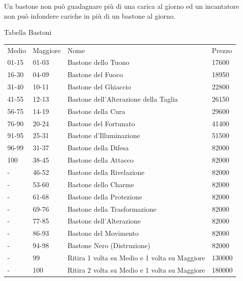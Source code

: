 \documentclass[a4paper,11pt,twoside,openany]{book}
\begin{document}
Un bastone non può guadagnare più di una carica al giorno ed un incantatore non può infondere cariche in più di un bastone al giorno.

\bigskip

Tabella Bastoni

\begin{tabularx}{0.95\textwidth}{llXl}
	\toprule
	Medio & Maggiore & Nome& Prezzo\\
	01-15 & 01-03    & Bastone dello Tuono \index{Bastone dello Tuono}     & 17600\\
	16-30 & 04-09    & Bastone del Fuoco \index{Bastone del Fuoco}         & 18950\\
	31-40 & 10-11    & Bastone del Ghiaccio \index{Bastone del Ghiaccio}   & 22800\\
	41-55 & 12-13    & Bastone dell'Alterazione della Taglia \index{Bastone dell'Alterazione della Taglia} & 26150\\
	56-75 & 14-19    & Bastone della Cura \index{Bastone della Cura}       & 29600\\
	76-90 & 20-24    & Bastone del Fortunato \index{Bastone del Fortunato} & 41400\\
	91-95 & 25-31    & Bastone d'Illuminazione \index{Bastone d'Illuminazione}             & 51500\\
	96-99 & 31-37    & Bastone della Difesa \index{Bastone della Difesa}   & 82000\\
	100   & 38-45    & Bastone della Attacco \index{Bastone della Attacco} & 82000\\
	-     & 46-52    & Bastone della Rivelazione \index{Bastone della Rivelazione}         & 82000\\
	-     & 53-60    & Bastone dello Charme \index{Bastone dello Charme}   & 82000\\
	-     & 61-68    & Bastone della Protezione \index{Bastone della Protezione}           & 82000\\
	-     & 69-76    & Bastone della Trasformazione \index{Bastone della Trasformazione}   & 82000\\
	-     & 77-85    & Bastone dell'Alterazione \index{Bastone dell'Alterazione}           & 82000\\
	-     & 86-93    & Bastone del Movimento \index{Bastone del Movimento} & 82000\\
	-     & 94-98    & Bastone Nero (Distruzione) \index{Bastone Nero (Distruzione)}       & 82000\\
	-     & 99       & Ritira 1 volta su Medio e 1 volta su Maggiore       & 130000\\
	-     & 100      & Ritira 2 volta su Medio e 1 volta su Maggiore       & 180000\\
\end{tabularx}
\end{document}
